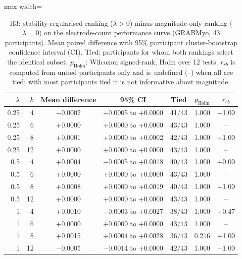 \begin{table}[htbp]
\centering
\small
\caption{H3: stability-regularised ranking ($\lambda > 0$) minus magnitude-only ranking ($\lambda = 0$) on the electrode-count performance curve (GRABMyo, 43 participants). Mean paired difference with 95\% participant cluster-bootstrap confidence interval (CI). Tied: participants for whom both rankings select the identical subset. $p_{\mathrm{Holm}}$: Wilcoxon signed-rank, Holm over 12 tests. $r_{rb}$ is computed from untied participants only and is undefined (--) when all are tied; with most participants tied it is not informative about magnitude.}
\label{tab:lambda}
\setlength{\tabcolsep}{4pt}
\begin{adjustbox}{max width=\textwidth}
\begin{tabular}{rrccccc}
\toprule
$\lambda$ & $k$ & Mean difference & 95\% CI & Tied & $p_{\mathrm{Holm}}$ & $r_{rb}$ \\
\midrule
0.25 & 4 & $-$0.0002 & $-$0.0005 to +0.0000 & 41/43 & 1.000 & $-$1.00 \\
0.25 & 6 & +0.0000 & +0.0000 to +0.0000 & 43/43 & 1.000 & -- \\
0.25 & 8 & +0.0001 & +0.0000 to +0.0002 & 42/43 & 1.000 & +1.00 \\
0.25 & 12 & +0.0000 & +0.0000 to +0.0000 & 43/43 & 1.000 & -- \\
0.5 & 4 & +0.0004 & $-$0.0005 to +0.0018 & 40/43 & 1.000 & +0.00 \\
0.5 & 6 & +0.0000 & +0.0000 to +0.0000 & 43/43 & 1.000 & -- \\
0.5 & 8 & +0.0008 & +0.0000 to +0.0019 & 40/43 & 1.000 & +1.00 \\
0.5 & 12 & +0.0000 & +0.0000 to +0.0000 & 43/43 & 1.000 & -- \\
1 & 4 & +0.0010 & $-$0.0003 to +0.0027 & 38/43 & 1.000 & +0.47 \\
1 & 6 & +0.0000 & +0.0000 to +0.0000 & 43/43 & 1.000 & -- \\
1 & 8 & +0.0015 & +0.0004 to +0.0028 & 36/43 & 0.216 & +1.00 \\
1 & 12 & $-$0.0005 & $-$0.0014 to +0.0000 & 42/43 & 1.000 & $-$1.00 \\
\bottomrule
\end{tabular}
\end{adjustbox}
\end{table}
